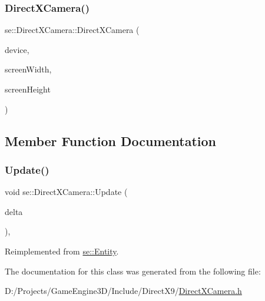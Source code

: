 \subsubsection{\texorpdfstring{Direct\+X\+Camera()}{DirectXCamera()}}
{\footnotesize\ttfamily se\+::\+Direct\+X\+Camera\+::\+Direct\+X\+Camera (\begin{DoxyParamCaption}\item[{L\+P\+D\+I\+R\+E\+C\+T3\+D\+D\+E\+V\+I\+C\+E9}]{device,  }\item[{int}]{screen\+Width,  }\item[{int}]{screen\+Height }\end{DoxyParamCaption})}



\subsection{Member Function Documentation}
\mbox{\label{classse_1_1_direct_x_camera_ae313a5d5a4d2c1b88e5f40285b31b921}} 
\subsubsection{\texorpdfstring{Update()}{Update()}}
{\footnotesize\ttfamily void se\+::\+Direct\+X\+Camera\+::\+Update (\begin{DoxyParamCaption}\item[{float}]{delta }\end{DoxyParamCaption})\hspace{0.3cm}{\ttfamily [override]}, {\ttfamily [virtual]}}



Reimplemented from \mbox{\hyperlink{classse_1_1_entity_a1cd277c4c5a517f5cde8b72d5c40a8f0}{se\+::\+Entity}}.



The documentation for this class was generated from the following file\+:\begin{DoxyCompactItemize}
\item 
D\+:/\+Projects/\+Game\+Engine3\+D/\+Include/\+Direct\+X9/\mbox{\hyperlink{_direct_x_camera_8h}{Direct\+X\+Camera.\+h}}\end{DoxyCompactItemize}
